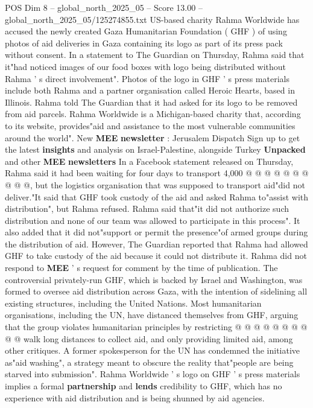 \begin{textsample}{POS Dim 8 – global\_north\_2025\_05 – Score 13.00 – global\_north\_2025\_05/125274855.txt}  \label{ex:f8_pos_038}
US-based charity Rahma Worldwide has accused the newly created Gaza Humanitarian Foundation ( GHF ) of using photos of aid deliveries in Gaza containing its logo as part of its press pack without consent.
In a statement to The Guardian on Thursday, Rahma said that it"had noticed images of our food boxes with logo being distributed without Rahma ' s direct involvement".
Photos of the logo in GHF ' s press materials include both Rahma and a partner organisation called Heroic Hearts, based in Illinois.
Rahma told The Guardian that it had asked for its logo to be removed from aid parcels.
Rahma Worldwide is a Michigan-based charity that, according to its website, provides"aid and assistance to the most vulnerable communities around the world".
New \textbf{MEE} \textbf{newsletter} : Jerusalem Dispatch Sign up to get the latest \textbf{insights} and analysis on Israel-Palestine, alongside Turkey \textbf{Unpacked} and other \textbf{MEE} \textbf{newsletters} In a Facebook statement released on Thursday, Rahma said it had been waiting for four days to transport 4,000 @ @ @ @ @ @ @ @ @ @, but the logistics organisation that was supposed to transport aid"did not deliver."It said that GHF took custody of the aid and asked Rahma to"assist with distribution", but Rahma refused.
Rahma said that"it did not authorize such distribution and none of our team was allowed to participate in this process".
It also added that it did not"support or permit the presence"of armed groups during the distribution of aid.
However, The Guardian reported that Rahma had allowed GHF to take custody of the aid because it could not distribute it.
Rahma did not respond to \textbf{MEE} ' s request for comment by the time of publication.
The controversial privately-run GHF, which is backed by Israel and Washington, was formed to oversee aid distribution across Gaza, with the intention of sidelining all existing structures, including the United Nations.
Most humanitarian organisations, including the UN, have distanced themselves from GHF, arguing that the group violates humanitarian principles by restricting @ @ @ @ @ @ @ @ @ @ walk long distances to collect aid, and only providing limited aid, among other critiques.
A former spokesperson for the UN has condemned the initiative as"aid washing", a strategy meant to obscure the reality that"people are being starved into submission".
Rahma Worldwide ' s logo on GHF ' s press materials implies a formal \textbf{partnership} and \textbf{lends} credibility to GHF, which has no experience with aid distribution and is being shunned by aid agencies.

\end{textsample}
